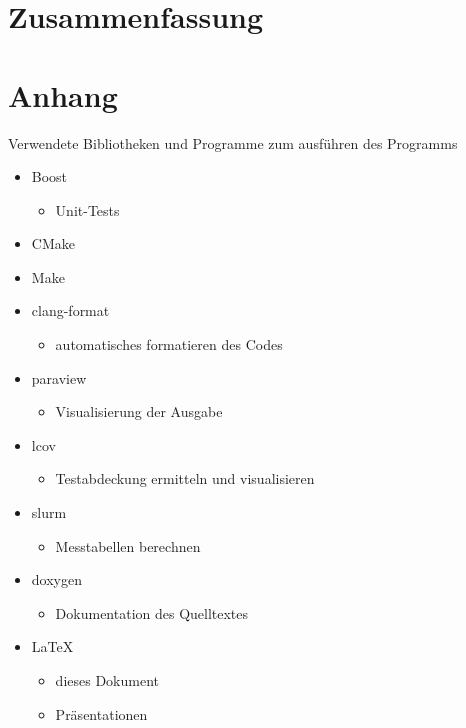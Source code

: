 \documentclass[
12pt,
a4paper,
BCOR10mm,
DIV14,
headsepline,
]{scrreprt}
\begin{document}
	\chapter{Zusammenfassung}
	\label{Zusammenfassung}
	
	
	
	
	
	
	
	\chapter{Anhang}
	\label{Anhang}
	Verwendete Bibliotheken und Programme zum ausführen des Programms
	\begin{itemize}
		\item Boost
		\begin{itemize}
			\item Unit-Tests
		\end{itemize}
		\item CMake 
		\item Make
		\item clang-format
		\begin{itemize}
			\item automatisches formatieren des Codes
		\end{itemize}
		\item paraview
		\begin{itemize}
			\item Visualisierung der Ausgabe
		\end{itemize}
		\item lcov
		\begin{itemize}
			\item Testabdeckung ermitteln und visualisieren
		\end{itemize}
		\item slurm
		\begin{itemize}
			\item Messtabellen berechnen
		\end{itemize}
		\item doxygen
		\begin{itemize}
			\item Dokumentation des Quelltextes
		\end{itemize}
		\item \LaTeX
		\begin{itemize}
			\item dieses Dokument
			\item Präsentationen
		\end{itemize}
	\end{itemize}
\end{document}
